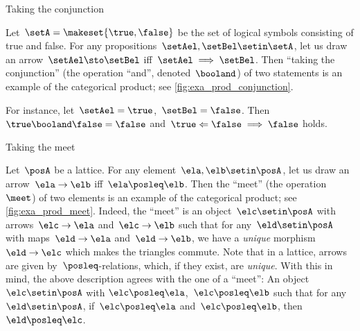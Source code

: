 \begin{marginfigure}
    \centering
    \caption{Taking the conjunction}
    \label{fig:exa_prod_conjunction}
\end{marginfigure}

\begin{example}
    \label{exa:conjunction-as-prod}
    Let~$\setA = \makeset{ \true, \false }$ be the set of logical symbols consisting of true and false.
    For any propositions~$\setAel, \setBel  \setin \setA$, let us draw an arrow~$\setAel \sto \setBel$ iff~$\setAel \implies \setBel$.
    Then ``taking the conjunction'' (the operation ``and'', denoted~$\booland$) of two statements is an example of the categorical product; see \cref{fig:exa_prod_conjunction}.

    For instance, let~$\setAel = \true$,~$\setBel = \false$.
    Then~$\true \booland \false = \false$ and~$\true \Leftarrow \false \implies \false$ holds.
\end{example}

\begin{marginfigure}
    \centering
    \caption{Taking the meet}
    \label{fig:exa_prod_meet}
\end{marginfigure}

\begin{example}
    \label{exa:meet-as-prod}
    Let~$\posA$ be a lattice.
    For any element~$\ela, \elb \setin \posA$, let us draw an arrow~$\ela \to \elb$ iff~$\ela \posleq \elb$.
    Then the ``meet'' (the operation~$\meet$) of two elements is an example of the categorical product; see \cref{fig:exa_prod_meet}.
    Indeed, the ``meet'' is an object~$\elc \setin \posA$ with arrows~$\elc\to \ela$ and~$\elc \to \elb$ such that for any~$\eld\setin \posA$ with maps~$\eld\to \ela$ and~$\eld\to \elb$, we have a \emph{unique} morphism~$\eld\to \elc$ which makes the triangles commute.
    Note that in a lattice, arrows are given by~$\posleq$-relations, which, if they exist, are \emph{unique}.
    With this in mind, the above description agrees with the one of a ``meet'':
    An object~$\elc\setin \posA$ with $\elc\posleq \ela$,~$\elc\posleq \elb$ such that for any~$\eld\setin \posA$, if~$\elc\posleq \ela$ and~$\elc\posleq \elb$, then~$\eld\posleq \elc$.
\end{example}

\begin{marginfigure}
    \centering
    \caption{}
    \label{fig:prod_generic}
\end{marginfigure}

